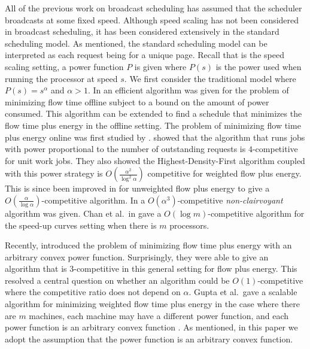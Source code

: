 \documentclass[11pt]{article}
\newcommand{\etal}{et al.\ }
\begin{document}
  All of the previous work on broadcast scheduling has assumed that the scheduler broadcasts at some fixed speed. Although speed scaling has not been considered in broadcast scheduling, it has been considered extensively in the standard scheduling model.  As mentioned, the standard scheduling model can be interpreted as each request being for a unique page.  Recall that is the speed scaling setting, a power function $P$ is given where $P(s)$ is the power used when running the processor at speed $s$.    We first consider the traditional model where $P(s)=s^\alpha$ and $\alpha > 1$.     In \cite{PruhsUW08} an efficient algorithm was given for  the problem of minimizing flow time offline subject to a bound on the amount of power consumed.  This algorithm can be extended to find a schedule that minimizes the flow time plus energy in the offline setting.  The problem of minimizing flow time plus energy online was first studied by \cite{AlbersF07}.  \cite{BansalPS09} showed that the algorithm that runs jobs with power proportional to the number of outstanding requests is $4$-competitive for unit work jobs.  They also showed the Highest-Density-First algorithm coupled with this power strategy is $O(\frac{\alpha^2}{\log^2 \alpha})$ competitive for weighted flow plus energy.     This is since been improved in \cite{LamLTW08}  for unweighted flow plus energy to give a $O(\frac{\alpha}{\log \alpha})$-competitive algorithm. In \cite{ChanELLMP09} a $O(\alpha^3)$-competitive \emph{non-clairvoyant} algorithm was given.  Chan \etal in \cite{ChanEP09} gave a $O(\log m)$-competitive algorithm for the speed-up curves setting when there is $m$ processors. 

 Recently, \cite{BansalCP09} introduced the problem of minimizing flow time plus energy with an arbitrary convex power function.  Surprisingly, they were able to give an algorithm that is $3$-competitive in this general setting for flow plus energy.  This resolved a central question on whether an algorithm could be $O(1)$-competitive where the competitive ratio does not depend on $\alpha$.   Gupta \etal gave a scalable algorithm for minimizing weighted flow time plus energy in the case where there are $m$ machines, each machine may have a different power function, and each power function is an arbitrary convex function \cite{GuptaKP10}. As mentioned, in this paper we adopt the assumption that the power function is an arbitrary convex function.\ \\
\end{document}
